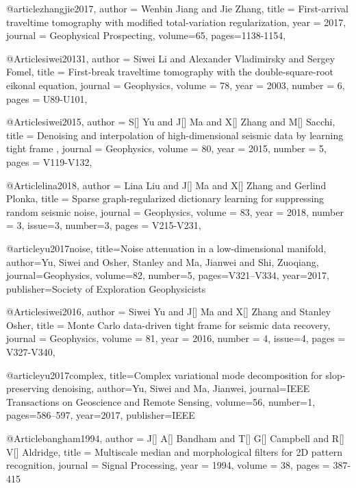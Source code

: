 @article{zhangjie2017,
  author =	 {Wenbin Jiang and Jie Zhang},
  title =	 {First-arrival traveltime tomography with modified total-variation
regularization},
  year =	 2017,
  journal =	{Geophysical Prospecting},
  volume={65},
 pages=1138-1154,
}



@Article{siwei20131,
  author =	 { Siwei Li and Alexander Vladimirsky and Sergey Fomel},
  title =	 { First-break traveltime tomography with the
double-square-root eikonal equation},
  journal =	 {Geophysics},
  volume =	 78,
  year =	 2003,
  number =	 6,
  pages =	 {U89-U101},
}

@Article{siwei2015,
  author =	 { S[] Yu and J[] Ma and X[] Zhang and M[] Sacchi},
  title =	 { Denoising and interpolation of high-dimensional seismic data by learning tight frame },
  journal =	 {Geophysics},
  volume =	 80,
  year =	 2015,
  number =	 5,
  pages =	 {V119-V132},
}


@Article{lina2018,
  author =	 { Lina Liu and J[] Ma and X[] Zhang and Gerlind Plonka},
  title =	 { Sparse graph-regularized dictionary learning for suppressing random seismic noise},
  journal =	 {Geophysics},
  volume =	 83,
  year =	 2018,
  number =	 3,
  issue=3,
  number=3,
  pages =	 {V215-V231},
}

@article{yu2017noise,
  title={Noise attenuation in a low-dimensional manifold},
  author={Yu, Siwei and Osher, Stanley and Ma, Jianwei and Shi, Zuoqiang},
  journal={Geophysics},
  volume={82},
  number={5},
  pages={V321--V334},
  year={2017},
  publisher={Society of Exploration Geophysicists}
}

@Article{siwei2016,
  author =	 { Siwei Yu and J[] Ma and X[] Zhang and Stanley Osher},
  title =	 { Monte Carlo data-driven tight frame for seismic data recovery},
  journal =	 {Geophysics},
  volume =	 81,
  year =	 2016,
  number =	 4,
  issue=4,
  pages =	 {V327-V340},
}


@article{yu2017complex,
  title={Complex variational mode decomposition for slop-preserving denoising},
  author={Yu, Siwei and Ma, Jianwei},
  journal={IEEE Transactions on Geoscience and Remote Sensing},
  volume={56},
  number={1},
  pages={586--597},
  year={2017},
  publisher={IEEE}
}


@Article{bangham1994,
  author = 	 {J[] A[] Bandham and T[] G[] Campbell and R[] V[] Aldridge},
  title = 	 {Multiscale median and morphological filters for 2{D} pattern recognition},
  journal = 	 { Signal Processing},
  year = 	 1994,
  volume = 	 38,
  pages = 	 {387-415}}
  
